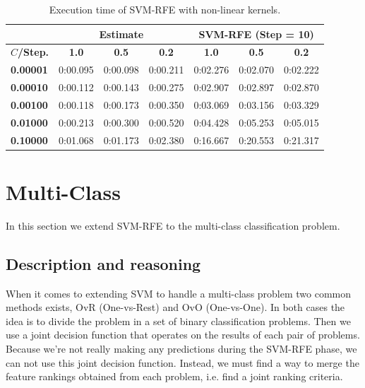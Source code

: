 \begin{table}[H]
    \centering
    \begin{tabular}{l | c c c | c c c}
        \toprule
         & \multicolumn{3}{c}{\textbf{Estimate}} & \multicolumn{3}{c}{\textbf{SVM-RFE (Step = 10)}} \\
        \midrule
        \textbf{$C$/Step.}&\textbf{1.0}&\textbf{0.5}&\textbf{0.2}&\textbf{1.0}&\textbf{0.5}&\textbf{0.2} \\
        \midrule
        \textbf{0.00001} & 0:00.095 & 0:00.098 & 0:00.211 &     0:02.276 & 0:02.070 & 0:02.222\\
        \textbf{0.00010} & 0:00.112 & 0:00.143 & 0:00.275 &     0:02.907 & 0:02.897 & 0:02.870\\
        \textbf{0.00100} & 0:00.118 & 0:00.173 & 0:00.350 &     0:03.069 & 0:03.156 & 0:03.329\\
        \textbf{0.01000} & 0:00.213 & 0:00.300 & 0:00.520 &     0:04.428 & 0:05.253 & 0:05.015\\
        \textbf{0.10000} & 0:01.068 & 0:01.173 & 0:02.380 &     0:16.667 & 0:20.553 & 0:21.317\\
        \bottomrule
        \end{tabular}
    \caption{Execution time of SVM-RFE with non-linear kernels.}
    \label{fig:ch5.stopcond.art.tabletime}
\end{table}



\section{Multi-Class}

In this section we extend SVM-RFE to the multi-class classification problem.

\subsection{Description and reasoning}
\label{sec:stopCond.desc}

When it comes to extending SVM to handle a multi-class problem two common methods exists, OvR (One-vs-Rest) and OvO (One-vs-One). In both cases the idea is to divide the problem in a set of binary classification problems. Then we use a joint decision function that operates on the results of each pair of problems. Because we're not really making any predictions during the SVM-RFE phase, we can not use this joint decision function. Instead, we must find a way to merge the feature rankings obtained from each problem, i.e. find a joint ranking criteria.

